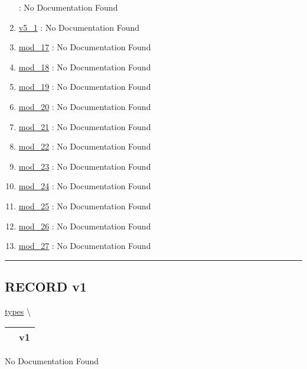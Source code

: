 \begin{enumerate}
: No Documentation Found
\item \hyperlink{ecldoc:types.v5_1}{v5\_1}
: No Documentation Found
\item \hyperlink{ecldoc:types.mod_17}{mod\_17}
: No Documentation Found
\item \hyperlink{ecldoc:types.mod_18}{mod\_18}
: No Documentation Found
\item \hyperlink{ecldoc:types.mod_19}{mod\_19}
: No Documentation Found
\item \hyperlink{ecldoc:types.mod_20}{mod\_20}
: No Documentation Found
\item \hyperlink{ecldoc:types.mod_21}{mod\_21}
: No Documentation Found
\item \hyperlink{ecldoc:types.mod_22}{mod\_22}
: No Documentation Found
\item \hyperlink{ecldoc:types.mod_23}{mod\_23}
: No Documentation Found
\item \hyperlink{ecldoc:types.mod_24}{mod\_24}
: No Documentation Found
\item \hyperlink{ecldoc:types.mod_25}{mod\_25}
: No Documentation Found
\item \hyperlink{ecldoc:types.mod_26}{mod\_26}
: No Documentation Found
\item \hyperlink{ecldoc:types.mod_27}{mod\_27}
: No Documentation Found
\end{enumerate}

\rule{\linewidth}{0.5pt}

\subsection*{\textsf{\colorbox{headtoc}{\color{white} RECORD}
v1}}

\hypertarget{ecldoc:types.v1}{}
\hspace{0pt} \hyperlink{ecldoc:types}{types} \textbackslash 

{\renewcommand{\arraystretch}{1.5}
\begin{tabularx}{\textwidth}{|>{\raggedright\arraybackslash}l|X|}
\hline
\hspace{0pt}\mytexttt{\color{red} } & \textbf{v1} \\
\hline
\end{tabularx}
}

\par





No Documentation Found







